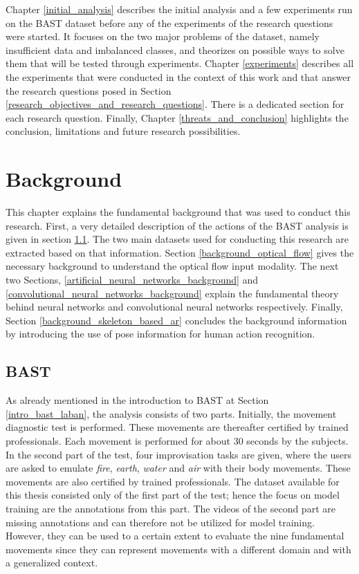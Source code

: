 \documentclass[extern,palatino]{cgMA}
\begin{document}
Chapter \ref{initial_analysis} describes the initial analysis and a few experiments run on the BAST dataset before any of the experiments of the research questions were started. It focuses on the two major problems of the dataset, namely insufficient data and imbalanced classes, and theorizes on possible ways to solve them that will be tested through experiments. Chapter \ref{experiments} describes all the experiments that were conducted in the context of this work and that answer the research questions posed in Section \ref{research_objectives_and_research_questions}. There is a dedicated section for each research question. Finally, Chapter \ref{threats_and_conclusion} highlights the conclusion, limitations and future research possibilities.

\newpage

\section{Background}
\label{background}
This chapter explains the fundamental background that was used to conduct this research. First, a very detailed description of the actions of the BAST analysis is given in section \ref{background_bast}. The two main datasets used for conducting this research are extracted based on that information. Section \ref{background_optical_flow} gives the necessary background to understand the optical flow input modality. The next two Sections, \ref{artificial_neural_networks_background} and \ref{convolutional_neural_networks_background} explain the fundamental theory behind neural networks and convolutional neural networks respectively. Finally, Section \ref{background_skeleton_based_ar} concludes the background information by introducing the use of pose information for human action recognition.

\subsection{BAST}
\label{background_bast}
As already mentioned in the introduction to BAST at Section \ref{intro_bast_laban}, the analysis consists of two parts. Initially, the movement diagnostic test is performed. These movements are thereafter certified by trained professionals. Each movement is performed for about 30 seconds by the subjects. In the second part of the test, four improvisation tasks are given, where the users are asked to emulate \textit{fire}, \textit{earth}, \textit{water} and \textit{air} with their body movements. These movements are also certified by trained professionals. The dataset available for this thesis consisted only of the first part of the test; hence the focus on model training are the annotations from this part. The videos of the second part are missing annotations and can therefore not be utilized for model training. However, they can be used to a certain extent to evaluate the nine fundamental movements since they can represent movements with a different domain and with a generalized context.
\end{document}
